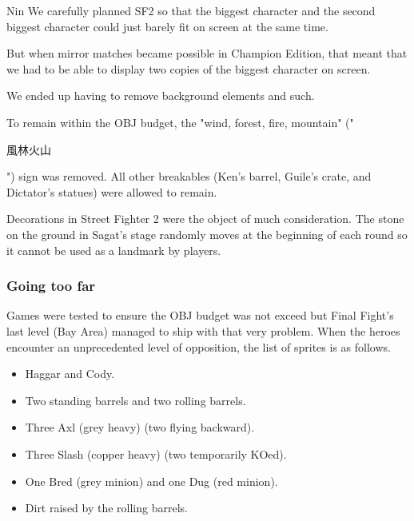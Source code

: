 \begin{q}{Nin}
We carefully planned SF2 so that the biggest character and the second biggest character could just barely fit on screen at the same time. 

But when mirror matches became possible in Champion Edition, that meant that we had to be able to display two copies of the biggest character on screen. 

We ended up having to remove background elements and such.
\end{q}

To remain within the OBJ budget, the "wind, forest, fire, mountain" ("\begin{CJK}{UTF8}{min}風林火山\end{CJK}") sign was removed. All other breakables (Ken's barrel, Guile's crate, and Dictator's statues) were allowed to remain.

\begin{trivia}
Decorations in Street Fighter 2 were the object of much consideration. The stone on the ground in Sagat's stage randomly moves at the beginning of each round so it cannot be used as a landmark by players.

\end{trivia}

\vfill
{}




\subsubsection{Going too far} \label{going_too_far}
Games were tested to ensure the OBJ budget was not exceed but Final Fight's last level (Bay Area) managed to ship with that very problem. When the heroes encounter an unprecedented level of opposition, the list of sprites is as follows\cite{ffoverload}.

\begin{itemize}[topsep=0pt]
\item Haggar and Cody.
\item Two standing barrels and two rolling barrels.
\item Three Axl (grey heavy) (two flying backward).
\item Three Slash (copper heavy) (two temporarily KOed).
\item One Bred (grey minion) and one Dug (red minion).
\item Dirt raised by the rolling barrels.
\end{itemize}

